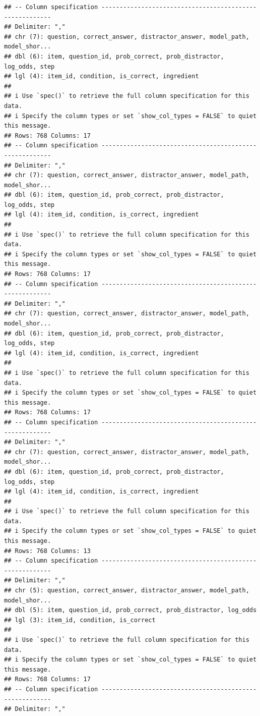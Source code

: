 \documentclass[
]{article}
\begin{document}
\begin{verbatim}
## -- Column specification --------------------------------------------------------
## Delimiter: ","
## chr (7): question, correct_answer, distractor_answer, model_path, model_shor...
## dbl (6): item, question_id, prob_correct, prob_distractor, log_odds, step
## lgl (4): item_id, condition, is_correct, ingredient
## 
## i Use `spec()` to retrieve the full column specification for this data.
## i Specify the column types or set `show_col_types = FALSE` to quiet this message.
## Rows: 768 Columns: 17
## -- Column specification --------------------------------------------------------
## Delimiter: ","
## chr (7): question, correct_answer, distractor_answer, model_path, model_shor...
## dbl (6): item, question_id, prob_correct, prob_distractor, log_odds, step
## lgl (4): item_id, condition, is_correct, ingredient
## 
## i Use `spec()` to retrieve the full column specification for this data.
## i Specify the column types or set `show_col_types = FALSE` to quiet this message.
## Rows: 768 Columns: 17
## -- Column specification --------------------------------------------------------
## Delimiter: ","
## chr (7): question, correct_answer, distractor_answer, model_path, model_shor...
## dbl (6): item, question_id, prob_correct, prob_distractor, log_odds, step
## lgl (4): item_id, condition, is_correct, ingredient
## 
## i Use `spec()` to retrieve the full column specification for this data.
## i Specify the column types or set `show_col_types = FALSE` to quiet this message.
## Rows: 768 Columns: 17
## -- Column specification --------------------------------------------------------
## Delimiter: ","
## chr (7): question, correct_answer, distractor_answer, model_path, model_shor...
## dbl (6): item, question_id, prob_correct, prob_distractor, log_odds, step
## lgl (4): item_id, condition, is_correct, ingredient
## 
## i Use `spec()` to retrieve the full column specification for this data.
## i Specify the column types or set `show_col_types = FALSE` to quiet this message.
## Rows: 768 Columns: 13
## -- Column specification --------------------------------------------------------
## Delimiter: ","
## chr (5): question, correct_answer, distractor_answer, model_path, model_shor...
## dbl (5): item, question_id, prob_correct, prob_distractor, log_odds
## lgl (3): item_id, condition, is_correct
## 
## i Use `spec()` to retrieve the full column specification for this data.
## i Specify the column types or set `show_col_types = FALSE` to quiet this message.
## Rows: 768 Columns: 17
## -- Column specification --------------------------------------------------------
## Delimiter: ","

\end{verbatim}
\end{document}

